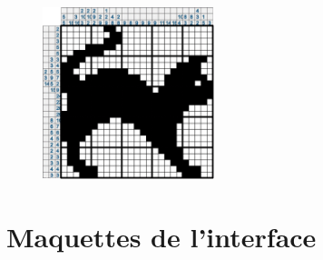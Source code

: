 \documentclass{report}
\begin{document}
\begin{figure}[H]
			\hspace{1cm}
			\includegraphics[width=5cm]{../Images/cat/cat6.png}
		\end{figure}
		
	
	\section{Maquettes de l'interface}
      
\end{document}
